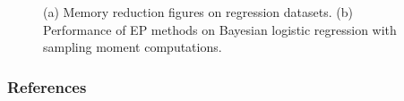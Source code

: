 \documentclass{article} %
\begin{document}
\begin{figure}
\centering
%
\begin{minipage}[!t]{0.5\linewidth}
\end{minipage}
%
\hspace{0.3in}
%
\begin{minipage}[!t]{0.35\linewidth}
\def\svgwidth{0.7\linewidth}
\subfigure[\label{fig:sep_logit}]{

}
\end{minipage}
%
\caption{(a) Memory reduction figures on regression datasets. (b) Performance of EP methods on Bayesian logistic regression with sampling moment computations.}
\end{figure}


\subsubsection*{References}
\renewcommand{\section}[2]{}
\small


\end{document}
